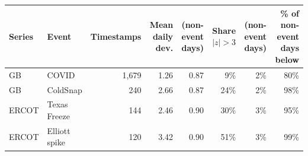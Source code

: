 \begin{tabular}{llrrrrrr}
\toprule
Series & Event & Timestamps & Mean daily dev. & (non-event days) & Share $|z|>3$ & (non-event days) & \% of non-event days below \\
\midrule
GB & COVID & 1,679 & 1.26 & 0.87 & 9\% & 2\% & 80\% \\
GB & ColdSnap & 240 & 2.66 & 0.87 & 24\% & 2\% & 98\% \\
ERCOT & Texas Freeze & 144 & 2.46 & 0.90 & 30\% & 3\% & 95\% \\
ERCOT & Elliott spike & 120 & 3.42 & 0.90 & 51\% & 3\% & 99\% \\
\bottomrule
\end{tabular}
